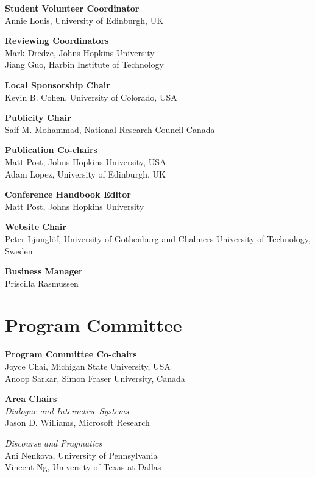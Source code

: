 {\bf Student Volunteer Coordinator} \\
Annie Louis, University of Edinburgh, UK

{\bf Reviewing Coordinators} \\
Mark Dredze, Johns Hopkins University \\
Jiang Guo, Harbin Institute of Technology

{\bf Local Sponsorship Chair} \\
Kevin B. Cohen, University of Colorado, USA

{\bf Publicity Chair} \\
Saif M. Mohammad, National Research Council Canada

{\bf Publication Co-chairs} \\
Matt Post, Johns Hopkins University, USA \\
Adam Lopez, University of Edinburgh, UK

{\bf Conference Handbook Editor} \\
Matt Post, Johns Hopkins University

{\bf Website Chair} \\
Peter Ljunglöf, University of Gothenburg and Chalmers University of Technology, Sweden

{\bf Business Manager} \\
Priscilla Rasmussen


\clearpage
\section{Program Committee}
\setlength{\parindent}{0pt}

\vspace*{0.5cm}

{\bf Program Committee Co-chairs} \\
Joyce Chai, Michigan State University, USA \\
Anoop Sarkar, Simon Fraser University, Canada

{\bf Area Chairs} \\
\emph{Dialogue and Interactive Systems} \\
\hspace*{0.2in} Jason D. Williams, Microsoft Research

\emph{Discourse and Pragmatics} \\
\hspace*{0.2in} Ani Nenkova, University of Pennsylvania \\
\hspace*{0.2in} Vincent Ng, University of Texas at Dallas 

